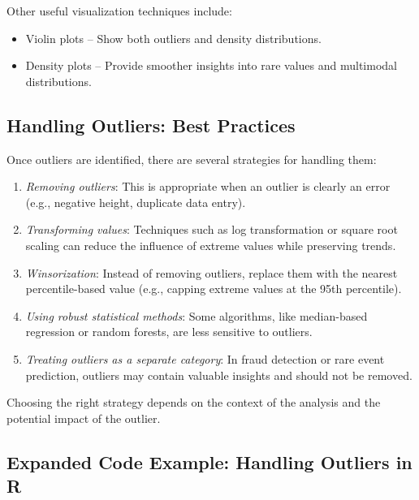 \documentclass[
]{book}
\providecommand{\tightlist}{%
  \setlength{\itemsep}{0pt}\setlength{\parskip}{0pt}}
\theoremstyle{definition}
\theoremstyle{definition}
\theoremstyle{definition}
\theoremstyle{definition}
\theoremstyle{remark}
\begin{document}
Other useful visualization techniques include:

\begin{itemize}
\tightlist
\item
  Violin plots -- Show both outliers and density distributions.
\item
  Density plots -- Provide smoother insights into rare values and multimodal distributions.
\end{itemize}

\subsection*{Handling Outliers: Best Practices}\label{handling-outliers-best-practices}

Once outliers are identified, there are several strategies for handling them:

\begin{enumerate}
\def\labelenumi{\arabic{enumi}.}
\tightlist
\item
  \emph{Removing outliers}: This is appropriate when an outlier is clearly an error (e.g., negative height, duplicate data entry).
\item
  \emph{Transforming values}: Techniques such as log transformation or square root scaling can reduce the influence of extreme values while preserving trends.
\item
  \emph{Winsorization}: Instead of removing outliers, replace them with the nearest percentile-based value (e.g., capping extreme values at the 95th percentile).
\item
  \emph{Using robust statistical methods}: Some algorithms, like median-based regression or random forests, are less sensitive to outliers.
\item
  \emph{Treating outliers as a separate category}: In fraud detection or rare event prediction, outliers may contain valuable insights and should not be removed.
\end{enumerate}

Choosing the right strategy depends on the context of the analysis and the potential impact of the outlier.

\subsection*{Expanded Code Example: Handling Outliers in R}\label{expanded-code-example-handling-outliers-in-r}
\end{document}
